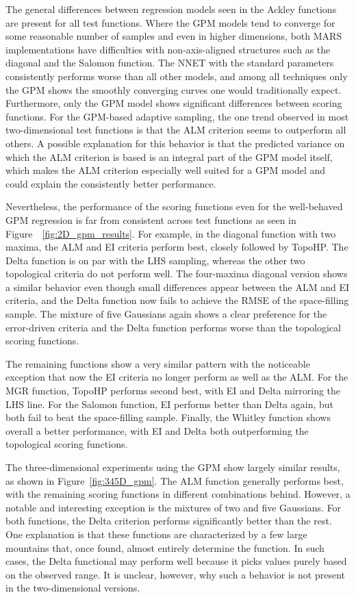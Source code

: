The general differences between regression models seen in the Ackley functions are present for all test functions.
%
Where the GPM models tend to converge for some reasonable number of samples and even in higher dimensions, both MARS implementations have difficulties with non-axis-aligned structures such as the diagonal and the Salomon function.
%
The NNET with the standard parameters consistently performs worse than all other models, and among all techniques only the GPM shows the smoothly converging curves one would traditionally expect.
%
Furthermore, only the GPM model shows significant differences between scoring functions.
%
For the GPM-based adaptive sampling, the one trend observed in most two-dimensional test functions is that the ALM criterion seems to outperform all others.
%
A possible explanation for this behavior is that the predicted variance on which the ALM criterion is based is an integral part of the GPM model itself, which makes the ALM criterion especially well suited for a GPM model and could explain the consistently better performance.

Nevertheless, the performance of the scoring functions even for the well-behaved GPM regression is far from consistent across test functions as seen in Figure~~\ref{fig:2D_gpm_results}.
%
For example, in the diagonal function with two maxima, the ALM and EI criteria perform best, closely followed by TopoHP.
%
The Delta function is on par with the LHS sampling, whereas the other two topological criteria do not perform well.
%
The four-maxima diagonal version shows a similar behavior even though small differences appear between the ALM and EI criteria, and the Delta function now fails to achieve the RMSE of the space-filling sample.
%
The mixture of five Gaussians again shows a clear preference for the error-driven criteria and the Delta function performs worse than the topological scoring functions.

The remaining functions show a very similar pattern with the noticeable exception that now the EI criteria no longer perform as well as the ALM.
%
For the MGR function, TopoHP performs second best, with EI and Delta mirroring the LHS line.
%
For the Salomon function, EI performs better than Delta again, but both fail to beat the space-filling sample.
%
Finally, the Whitley function shows overall a better performance, with EI and Delta both outperforming the topological scoring functions.

The three-dimensional experiments using the GPM show largely similar results, as shown in
Figure~\ref{fig:345D_gpm}.
%
The ALM function generally performs best, with the remaining scoring functions in different combinations behind.
%
However, a notable and interesting exception is the mixtures of two and five Gaussians.
%
For both functions, the Delta criterion performs significantly better than the rest.
%
One explanation is that these functions are characterized by a few large mountains
that, once found, almost entirely determine the function.
%
In such cases, the Delta functional may perform well because it picks values purely based on the observed range.
%
It is unclear, however, why such a behavior is not present in the two-dimensional versions.

